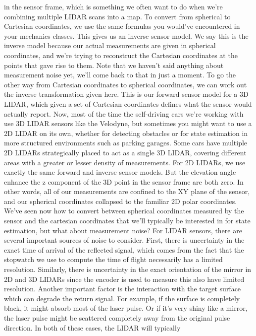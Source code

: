 in the sensor frame, which is something we often
want to do when we're combining multiple
LIDAR scans into a map. To convert from spherical
to Cartesian coordinates, we use the same formulas you would've encountered in your mechanics classes. This gives us an inverse sensor model. We say this is the inverse model because our actual measurements are
given in spherical coordinates, and we're trying to
reconstruct the Cartesian coordinates at the points
that gave rise to them. Note that we haven't said anything
about measurement noise yet, we'll come back to that in just a moment. To go the other way from Cartesian
coordinates to spherical coordinates, we can work out the inverse
transformation given here. This is our forward sensor
model for a 3D LIDAR, which given a set of Cartesian coordinates defines what
the sensor would actually report. Now, most of the time the
self-driving cars we're working with use 3D LIDAR sensors
like the Velodyne, but sometimes you might want
to use a 2D LIDAR on its own, whether for detecting obstacles
or for state estimation in more structured environments
such as parking garages. Some cars have multiple 2D LIDARs strategically placed to
act as a single 3D LIDAR, covering different areas with a greater
or lesser density of measurements. For 2D LIDARs, we use exactly the same
forward and inverse sensor models. But the elevation angle
enhance the z component of the 3D point in the sensor
frame are both zero. In other words, all of
our measurements are confined to the XY plane of the sensor, and our spherical
coordinates collapsed to the familiar 2D polar coordinates. We've seen now how to convert between
spherical coordinates measured by the sensor and the cartesian coordinates that we'll typically be
interested in for state estimation, but what about measurement noise? For LIDAR sensors, there are several important sources
of noise to consider. First, there is uncertainty in the exact time of arrival
of the reflected signal, which comes from the fact that
the stopwatch we use to compute the time of flight necessarily
has a limited resolution. Similarly, there is uncertainty in the exact orientation
of the mirror in 2D and 3D LIDARs since the encoder is used to measure
this also have limited resolution. Another important factor
is the interaction with the target surface which can
degrade the return signal. For example, if the surface
is completely black, it might absorb most of the laser pulse. Or if it's very shiny like a mirror, the laser pulse might be scattered completely away from
the original pulse direction. In both of these cases, the LIDAR will typically

